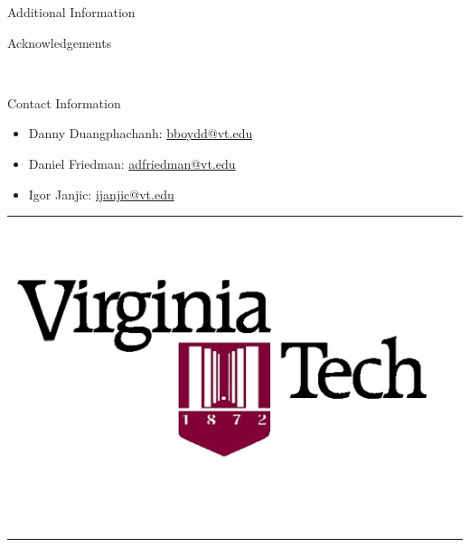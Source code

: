\documentclass[final]{beamer}
\newlength{\onecolwid}
\begin{document}
\begin{frame}[t]
\begin{columns}[t]
\begin{column}{\onecolwid}
\begin{block}{Additional Information}
\end{block}



\begin{block}{Acknowledgements}

\small{} \\

\end{block}



\begin{alertblock}{Contact Information}

\begin{itemize}
\item Danny Duangphachanh: \href{mailto:bboydd@vt.edu}{bboydd@vt.edu}
\item Daniel Friedman: \href{mailto:adfriedman@vt.edu}{adfriedman@vt.edu}
\item Igor Janjic: \href{mailto:ijanjic@vt.edu}{ijanjic@vt.edu}
\end{itemize}

\end{alertblock}

\begin{center}
\begin{tabular}{ccc}
\includegraphics[width=0.4\linewidth]{Logo} 
\end{tabular}
\end{center}


\end{column} %

\end{columns} %

\end{frame} %
\end{document}
